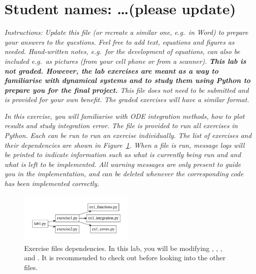 \documentclass{cmc}
\begin{document}
\pagestyle{fancy}
 

\section*{Student names: \ldots (please update)}

\textit{Instructions: Update this file (or recreate a similar one, e.g.\ in
  Word) to prepare your answers to the questions. Feel free to add text,
  equations and figures as needed. Hand-written notes, e.g.\ for the development
  of equations, can also be included e.g.\ as pictures (from your cell phone or
  from a scanner).  \textbf{This lab is not graded. However, the lab exercises
    are meant as a way to familiarise with dynamical systems and to study them
    using Python to prepare you for the final project.} This file does not need
  to be submitted and is provided for your own benefit. The graded exercises
  will have a similar format.}

\textit{In this exercise, you will familiarise with ODE integration methods, how
  to plot results and study integration error. The file  is
  provided to run all exercises in Python. Each  can be
  run to run an exercise individually. The list of exercises and their
  dependencies are shown in Figure~\ref{fig:files}. When a file is run, message
  logs will be printed to indicate information such as what is currently being
  run and and what is left to be implemented. All warning messages are only
  present to guide you in the implementation, and can be deleted whenever the
  corresponding code has been implemented correctly.}

\begin{figure}[ht]
  \centering \includegraphics[width=0.5\textwidth]{figures/files}
  \caption{\label{fig:files} Exercise files dependencies. In this lab, you will
    be modifying , ,
    , and
    . It is recommended to check out
     before looking into the other 
    files.}
\end{figure}
\end{document}
